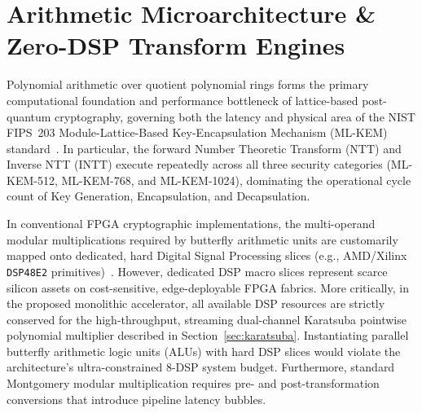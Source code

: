 \section{Arithmetic Microarchitecture \& Zero-DSP Transform Engines}
\label{sec:arithmetic}

Polynomial arithmetic over quotient polynomial rings forms the primary computational foundation and performance bottleneck of lattice-based post-quantum cryptography, governing both the latency and physical area of the NIST FIPS~203 Module-Lattice-Based Key-Encapsulation Mechanism (\mbox{ML-KEM}) standard~\cite{fips203}. In particular, the forward Number Theoretic Transform ($\text{NTT}$) and Inverse NTT ($\text{INTT}$) execute repeatedly across all three security categories (ML-KEM-512, ML-KEM-768, and ML-KEM-1024), dominating the operational cycle count of Key Generation, Encapsulation, and Decapsulation.

In conventional FPGA cryptographic implementations, the multi-operand modular multiplications required by butterfly arithmetic units are customarily mapped onto dedicated, hard Digital Signal Processing slices (e.g., AMD/Xilinx \texttt{DSP48E2} primitives)~\cite{banerjee2021sapphire, xing2023tcas1, imran2022tvlsi}. However, dedicated DSP macro slices represent scarce silicon assets on cost-sensitive, edge-deployable FPGA fabrics. More critically, in the proposed monolithic accelerator, all available DSP resources are strictly conserved for the high-throughput, streaming dual-channel Karatsuba pointwise polynomial multiplier described in Section~\ref{sec:karatsuba}. Instantiating parallel butterfly arithmetic logic units (ALUs) with hard DSP slices would violate the architecture's ultra-constrained 8-DSP system budget. Furthermore, standard Montgomery modular multiplication requires pre- and post-transformation conversions that introduce pipeline latency bubbles.

